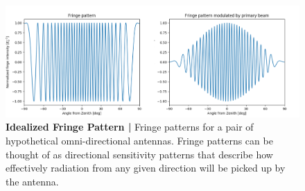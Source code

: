 \documentclass[12pt,a4paper]{article}
\begin{document}
\begin{figure}
\centering
\includegraphics[width=\textwidth]{_images/FringePattern.png}
\caption{\textbf{ Idealized Fringe Pattern |} Fringe patterns for a pair of hypothetical omni-directional antennas. Fringe patterns can be thought of as directional sensitivity patterns that describe how effectively radiation from any given direction will be picked up by the antenna.}
\end{figure}
\end{document}
